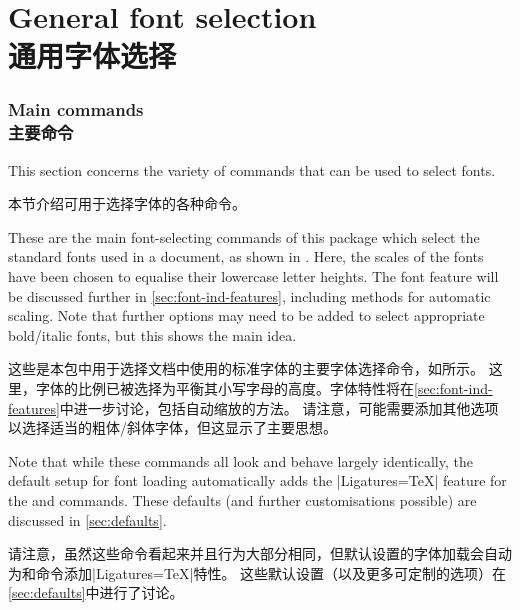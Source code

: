 \documentclass[a4paper]{l3doc}
\begin{document}
\part{General font selection\\通用字体选择}

\section{Main commands\\主要命令}
\label{sec:main-cmd}

This section concerns the variety of commands that can be used to select
fonts.

本节介绍可用于选择字体的各种命令。

\bigskip
{}

These are the main font-selecting commands of this package which select the standard fonts used in a document, as shown in .
Here, the scales of the fonts have been chosen to equalise their
lowercase letter heights. The  font feature will be discussed
further in \vref{sec:font-ind-features}, including methods for automatic
scaling.
Note that further options may need to be added to select appropriate bold/italic fonts,
but this shows the main idea.

这些是本包中用于选择文档中使用的标准字体的主要字体选择命令，如所示。
这里，字体的比例已被选择为平衡其小写字母的高度。字体特性将在\vref{sec:font-ind-features}中进一步讨论，包括自动缩放的方法。
请注意，可能需要添加其他选项以选择适当的粗体/斜体字体，但这显示了主要思想。

Note that while these commands all look and behave largely identically, the default setup for font loading automatically adds the |Ligatures=TeX| feature for the  and  commands.
These defaults (and further customisations possible) are discussed in \vref{sec:defaults}.

请注意，虽然这些命令看起来并且行为大部分相同，但默认设置的字体加载会自动为和命令添加|Ligatures=TeX|特性。
这些默认设置（以及更多可定制的选项）在\vref{sec:defaults}中进行了讨论。

\bigskip
{}
\end{document}
